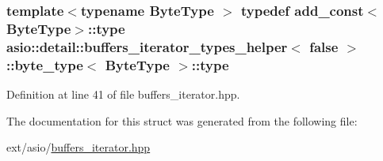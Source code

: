 \subsubsection[{type}]{\setlength{\rightskip}{0pt plus 5cm}template$<$typename Byte\+Type $>$ typedef add\+\_\+const$<$Byte\+Type$>$\+::{\bf type} {\bf asio\+::detail\+::buffers\+\_\+iterator\+\_\+types\+\_\+helper}$<$ false $>$\+::byte\+\_\+type$<$ Byte\+Type $>$\+::{\bf type}}\label{structasio_1_1detail_1_1buffers__iterator__types__helper_3_01false_01_4_1_1byte__type_abb2587843440c828841ab928e6b319da}


Definition at line 41 of file buffers\+\_\+iterator.\+hpp.



The documentation for this struct was generated from the following file\+:\begin{DoxyCompactItemize}
\item 
ext/asio/\hyperlink{buffers__iterator_8hpp}{buffers\+\_\+iterator.\+hpp}\end{DoxyCompactItemize}
